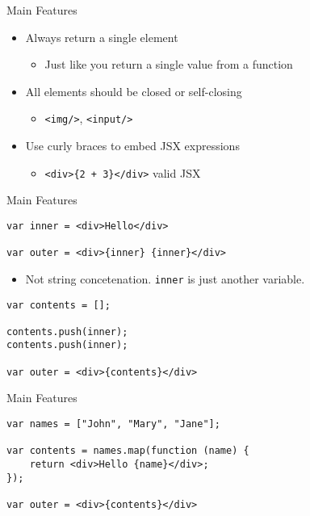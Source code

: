 \documentclass[presentation]{beamer}
\begin{document}
\begin{frame}[fragile,label={sec:orgheadline5}]{Main Features}
 \begin{itemize}
\item Always return a single element
\begin{itemize}
\item Just like you return a single value from a function
\end{itemize}
\item All elements should be closed or self-closing
\begin{itemize}
\item \texttt{<img/>}, \texttt{<input/>}
\end{itemize}
\item Use curly braces to embed JSX expressions
\begin{itemize}
\item \texttt{<div>\{2 + 3\}</div>} valid JSX
\end{itemize}
\end{itemize}
\end{frame}

\begin{frame}[fragile,label={sec:orgheadline6}]{Main Features}
 \begin{verbatim}
var inner = <div>Hello</div>

var outer = <div>{inner} {inner}</div>
\end{verbatim}
\begin{itemize}
\item Not string concetenation. \texttt{inner} is just another variable.
\end{itemize}
\begin{verbatim}
var contents = [];

contents.push(inner);
contents.push(inner);

var outer = <div>{contents}</div>
\end{verbatim}
\end{frame}

\begin{frame}[fragile,label={sec:orgheadline7}]{Main Features}
 \begin{verbatim}
var names = ["John", "Mary", "Jane"];

var contents = names.map(function (name) {
    return <div>Hello {name}</div>;
});

var outer = <div>{contents}</div>
\end{verbatim}
\end{frame}
\end{document}

